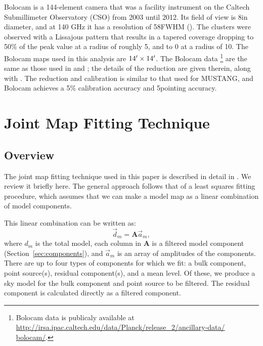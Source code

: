 \documentclass[iop,numberedappendix,apj]{emulateapj}
\begin{document}
Bolocam is a 144-element camera that was a facility instrument on the Caltech Submillimeter Observatory (CSO) from
2003 until 2012. Its field of view is 8\amins in diameter, and at 140 GHz it has a resolution of 58\asecs FWHM
(\citet{glenn1998,haig2004}). The clusters were observed with a Lissajous pattern that results in a tapered
coverage dropping to 50\% of the peak value at a radius of roughly 5\amin, and to 0 at a radius of 10\amin.
The Bolocam maps used in this analysis are $14\mbox{$^\prime$} \times 14\mbox{$^\prime$}$. The Bolocam data 
\footnote{Bolocam data is publicaly available at 
\href{http://irsa.ipac.caltech.edu/data/Planck/release\_2/ancillary-data/bolocam/}
{http://irsa.ipac.caltech.edu/data/Planck/release\_2/ancillary-data/} 
\href{http://irsa.ipac.caltech.edu/data/Planck/release\_2/ancillary-data/bolocam/}{bolocam/}.} 
are the same as those used in \citet{czakon2015} and \citet{sayers2013}; the details of the reduction are 
given therein, along with \citet{sayers2011}. 
The reduction and calibration is similar to that used for MUSTANG, and Bolocam achieves a 
5\% calibration accuracy and 5\asecs pointing accuracy.

\section{Joint Map Fitting Technique}
\label{sec:jointfitting}

\subsection{Overview}
\label{sec:jf_overview}

The joint map fitting technique used in this paper is described in detail in \citet{romero2015a}. We review
it briefly here. The general approach follows that of a least squares fitting procedure, which assumes that
we can make a model map as a linear combination of model components. 

This linear combination can be written as:
\begin{equation}
  \vec{d}_m = \mathbf{A} \vec{a}_m,
  \label{eqn:model_array}
\end{equation}
where $d_m$ is the total model, each column in $\mathbf{A}$ is a filtered model component (Section~\ref{sec:components}), 
and $\vec{a}_m$ is 
an array of amplitudes of the components. There are up to four types of components for which we fit: 
a bulk component, point source(s), residual component(s), and a mean level. Of these, we produce a
sky model for the bulk component and point source to be filtered. The residual component is calculated 
directly as a filtered component.
\end{document}
